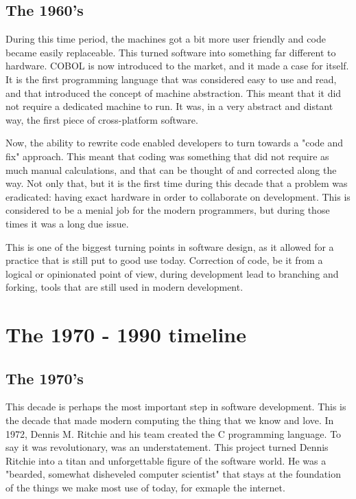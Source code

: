 \subsection{The 1960's}
During this time period, the machines got a bit more user friendly and code became easily replaceable.
This turned software into something far different to hardware.
COBOL is now introduced to the market, and it made a case for itself.
It is the first programming language that was considered easy to use and read, and that introduced the concept of machine abstraction.
This meant that it did not require a dedicated machine to run.
It was, in a very abstract and distant way, the first piece of cross-platform software.

\par
Now, the ability to rewrite code enabled developers to turn towards a "code and fix" approach\cite{boehmb06}.
This meant that coding was something that did not require as much manual calculations, and that can be thought of and corrected along the way.
Not only that, but it is the first time during this decade that a problem was eradicated: having exact hardware in order to collaborate on development.
This is considered to be a menial job for the modern programmers, but during those times it was a long due issue.
\par
This is one of the biggest turning points in software design, as it allowed for a practice that is still put to good use today.
Correction of code, be it from a logical or opinionated point of view, during development lead to branching and forking, tools that are still used in modern development.



\section{The 1970 - 1990 timeline}
\subsection{The 1970's}
This decade is perhaps the most important step in software development.
This is the decade that made modern computing the thing that we know and love.
In 1972, Dennis M.
Ritchie and his team created the C programming language.
To say it was revolutionary, was an understatement.
This project turned Dennis Ritchie into a titan and unforgettable figure of the software world.
He was a "bearded, somewhat disheveled computer scientist"\cite{ritchieJobs} that stays at the foundation of the things we make most use of today, for exmaple the internet.

